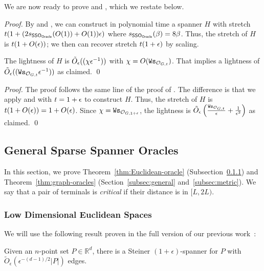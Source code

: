 We are now ready to prove  and , which we restate below.

\GeneralStretchT*
\begin{proof}
	By  and , we can construct in polynomial time a spanner $H$ with stretch $t(1 + (2s_{\mathsf{SSO}_{\mathsf{Oracle}}}(O(1)) +  O(1))\epsilon)$ where $s_{\mathsf{SSO}_{\mathsf{Oracle}}}(\beta) = 8\beta$. Thus, the stretch of $H$ is $t(1 + O(\epsilon))$; we then can recover stretch $t(1+\epsilon)$ by scaling. 
	
	The lightness of $H$ is  $\tilde{O}_{\epsilon}((\chi \epsilon^{-1}))$ with  $\chi = O(\mathtt{Ws}_{\mathcal{O}_{G,t}})$. That implies a lightness of  $\tilde{O}_{\epsilon}((\mathtt{Ws}_{\mathcal{O}_{G,t}} \epsilon^{-1}))$  as claimed. \qed
\end{proof}

\GeneralStretchE*
\begin{proof} The proof follows the same line of the proof of . The difference is that we  apply  and  with $t =  1+\epsilon$ to construct $H$. Thus, the stretch of $H$ is $t(1 + O(\epsilon)) = 1 + O(\epsilon)$. Since   $\chi  = \mathtt{Ws}_{\mathcal{O}_{G,1+\epsilon}}$, the lightness is $\tilde{O}_{\epsilon}\left(\frac{\mathtt{Ws}_{\mathcal{O}_{G,t}}}{\epsilon} + \frac{1}{\epsilon^2}\right)$ as claimed.	\qed
\end{proof}

\subsection{General Sparse Spanner Oracles}\label{subsec:Oracle}

In this section, we prove Theorem~\ref{thm:Euclidean-oracle} (Subsection~\ref{subsec:Euclidean})  and Theorem~\ref{thm:graph-oracles} (Section~\ref{subsec:general} and~\ref{subsec:metric}). We say that a pair of terminals  is \emph{critical} if their distance is in $[L, 2L)$.

\subsubsection{Low Dimensional Euclidean Spaces}\label{subsec:Euclidean}

We will use the following result proven in the full version of our previous work~\cite{LS19}:

\begin{theorem}\label{thm:sparse-Steiner}  Given an $n$-point set $P \in \mathbb{R}^d$, there is a Steiner $(1+\epsilon)$-spanner for $P$ with  $\tilde{O}_{\epsilon}(\epsilon^{-(d-1)/2} |P|)$ edges.
\end{theorem}


